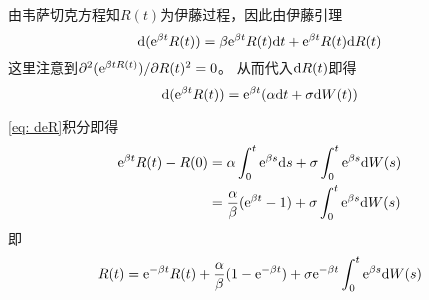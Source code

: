 \documentclass[cn]{homework}
\begin{document}
    \problem[习题4.8]
    \begin{subproblem}
        \item
        由韦萨切克方程知$R(t)$为伊藤过程，因此由伊藤引理
        \[\mathrm d (\mathrm e^{\beta t}R(t))=\beta\mathrm e^{\beta t}R(t)\mathrm d t
        +\mathrm e^{\beta t}R(t)\mathrm d R(t)\]
        这里注意到$\partial^2(\mathrm e^{\beta tR(t)})/\partial R(t)^2=0$。
        从而代入$\mathrm d R(t)$即得
        \begin{equation}
            \label{eq: deR}
            \mathrm d (\mathrm e^{\beta t}R(t))=\mathrm e^{\beta t}(\alpha\mathrm d t+\sigma\mathrm d W(t))
        \end{equation}

        \item
        \cref{eq: deR}积分即得
        \[\begin{aligned}
            \mathrm e^{\beta t}R(t)-R(0)&=\alpha\int_0^t\mathrm e^{\beta s}\mathrm d s
            +\sigma\int_0^t\mathrm e^{\beta s}\mathrm d W(s)\\
            &=\frac{\alpha}{\beta}(\mathrm e^{\beta t}-1)+\sigma\int_0^t\mathrm e^{\beta s}\mathrm d W(s)
        \end{aligned}\]
        即
        \[R(t)=\mathrm e^{-\beta t}R(t)+\frac{\alpha}{\beta}(1-\mathrm e^{-\beta t})
        +\sigma\mathrm e^{-\beta t}\int_0^t\mathrm e^{\beta s}\mathrm d W(s)\]
    \end{subproblem}
\end{document}
